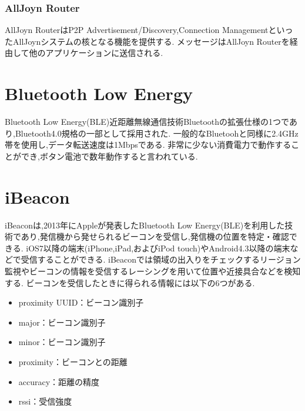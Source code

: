 \subsubsection{AllJoyn Router}
AllJoyn RouterはP2P Advertisement/Discovery,Connection ManagementといったAllJoynシステムの核となる機能を提供する.
メッセージはAllJoyn Routerを経由して他のアプリケーションに送信される.



\section{Bluetooth Low Energy}
Bluetooth Low Energy(BLE)\cite{BLE1}\cite{BLE2}近距離無線通信技術Bluetoothの拡張仕様の1つであり,Bluetooth4.0規格の一部として採用された.
一般的なBluetoohと同様に2.4GHz帯を使用し,データ転送速度は1Mbpsである.
非常に少ない消費電力で動作することができ,ボタン電池で数年動作すると言われている.

\section{iBeacon}
iBeacon\cite{iBeacon}\cite{iBeaconを使用してみよう}は,2013年にAppleが発表したBluetooth Low Energy(BLE)を利用した技術であり,発信機から発せられるビーコンを受信し,発信機の位置を特定・確認できる.
iOS7以降の端末(iPhone,iPad,およびiPod touch)やAndroid4.3以降の端末などで受信することができる.
iBeaconでは領域の出入りをチェックするリージョン監視やビーコンの情報を受信するレーシングを用いて位置や近接具合などを検知する.
ビーコンを受信したときに得られる情報には以下の6つがある.

\begin{itemize}
\item proximity UUID：ビーコン識別子
\item major：ビーコン識別子
\item minor：ビーコン識別子
\item proximity：ビーコンとの距離
\item accuracy：距離の精度
\item rssi：受信強度
\end{itemize}

